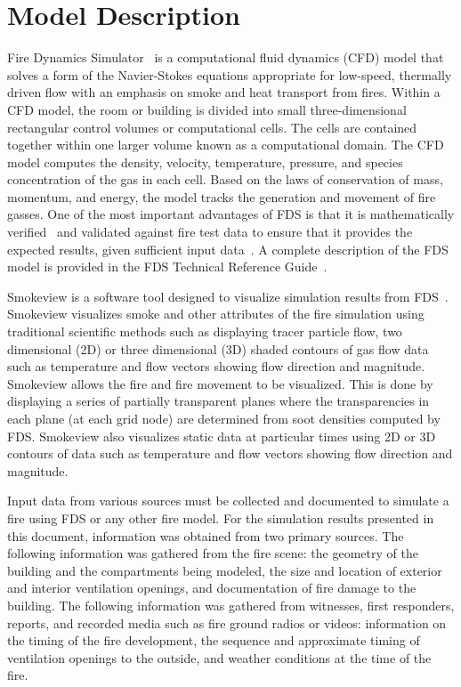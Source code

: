 \documentclass[12pt,oneside]{book}
\begin{document}
\chapter{Model Description}
\label{model}
Fire Dynamics Simulator~\cite{FDS_Users_Guide} is a computational fluid dynamics (CFD) model that solves a form of the Navier-Stokes equations appropriate for low-speed, thermally driven flow with an emphasis on smoke and heat transport from fires.  Within a CFD model, the room or building is divided into small three-dimensional rectangular control volumes or computational cells.  The cells are contained together within one larger volume known as a computational domain.  The CFD model computes the density, velocity, temperature, pressure, and species concentration of the gas in each cell.  Based on the laws of conservation of mass, momentum,  and energy, the model tracks the generation and movement of fire gasses. One of the most important advantages of FDS is that it is  mathematically verified~\cite{FDS_Verification_Guide} and validated against fire test data to ensure that it provides the expected results, given sufficient input data~\cite{FDS_Validation_Guide}. A complete description of the FDS model is provided in the FDS Technical Reference Guide~\cite{FDS_Math_Guide}.

Smokeview is a software tool designed to visualize simulation results from FDS~\cite{Smokeview_Users_Guide}. Smokeview visualizes smoke and other attributes of the fire simulation using traditional scientific methods such as displaying tracer particle flow, two dimensional (2D) or three dimensional (3D) shaded contours of gas flow data such as temperature and flow vectors showing flow direction and magnitude. Smokeview allows the fire and fire movement to be visualized. This is done by displaying a series of partially transparent planes where the transparencies in each plane (at each grid node) are determined from soot densities computed by FDS. Smokeview also visualizes static data at particular times using 2D or 3D contours of data such as temperature and flow vectors showing flow direction and magnitude.

Input data from various sources must be collected and documented to simulate a fire using FDS or any other fire model. For the simulation results presented in this document, information was obtained from two primary sources. The following information was gathered from the fire scene: the geometry of the building and the compartments being modeled, the size and location of exterior and interior ventilation openings, and documentation of fire damage to the building. The following information was gathered from witnesses, first responders, reports, and recorded media such as fire ground radios or videos: information on the timing of the fire development, the sequence and approximate timing of ventilation openings to the outside, and weather conditions at the time of the fire. 
\end{document}
